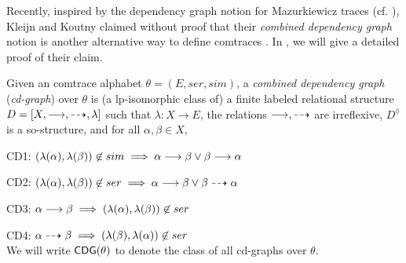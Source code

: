 \documentclass{llncs}
\begin{document}
Recently, inspired by the dependency graph notion for Mazurkiewicz traces (cf. \cite[Chapter 2]{DR}), Kleijn and Koutny claimed without proof that their \emph{combined dependency graph} notion is another alternative way to define comtraces \cite{KK08}. In , we will give a detailed proof of their claim.


\begin{definition} 
Given an comtrace alphabet $\theta=(E,ser,sim)$, a \emph{combined dependency graph} (\emph{cd-graph}) over $\theta$ is (a lp-isomorphic class of) a finite labeled relational structure $D=\left[ X,\longrightarrow,\dashrightarrow,\lambda \right]$ such that $\lambda:X\rightarrow E$, the relations $\longrightarrow,\dashrightarrow$ are irreflexive, $D^{\lozenge}$ is a so-structure, and for all $\alpha,\beta\in X$,\smallskip

\textsf{CD1:\mbox{\hspace{5mm}}} $(\lambda(\alpha),\lambda(\beta))\not\in sim \implies \alpha \longrightarrow \beta \vee \beta \longrightarrow \alpha$

\textsf{CD2:\mbox{\hspace{5mm}}} $(\lambda(\alpha),\lambda(\beta))\not\in ser \implies \alpha \longrightarrow \beta \vee \beta \dashrightarrow \alpha$

\textsf{CD3:\mbox{\hspace{5mm}}} $\alpha \longrightarrow \beta \implies (\lambda(\alpha),\lambda(\beta))\not\in ser$

\textsf{CD4:\mbox{\hspace{5mm}}} $\alpha \dashrightarrow \beta \implies (\lambda(\beta),\lambda(\alpha))\not\in ser$\smallskip\\
We will write $\mathsf{CDG}(\theta)$ to denote the class of all cd-graphs over $\theta$. \EOD
\label{def:comdag}
\end{definition}
\end{document}
